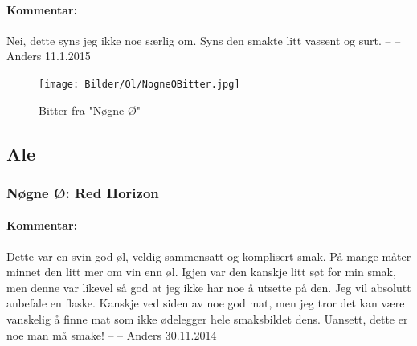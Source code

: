 \documentclass[12pt,a4paper,oneside,norsk]{article}
\begin{document}
\paragraph{Kommentar:}Nei, dette syns jeg ikke noe særlig om. Syns den smakte litt vassent og surt.
\newline
-- -- Anders 11.1.2015

\begin{figure} [H]
\centering
\texttt{[image: Bilder/Ol/NogneOBitter.jpg]} 
\caption{Bitter fra "Nøgne Ø"}
\end{figure}

\newpage

\subsection{Ale}

\subsubsection{Nøgne Ø: Red Horizon }
\paragraph{Kommentar:} Dette var en svin god øl, veldig sammensatt og komplisert smak. På mange måter minnet den litt mer om vin enn øl. Igjen var den kanskje litt søt for min smak, men denne var likevel så god at jeg ikke har noe å utsette på den. Jeg vil absolutt anbefale en flaske. Kanskje ved siden av noe god mat, men jeg tror det kan være vanskelig å finne mat som ikke ødelegger hele smaksbildet dens. Uansett, dette er noe man må smake!
\newline
-- -- Anders 30.11.2014
\end{document}
